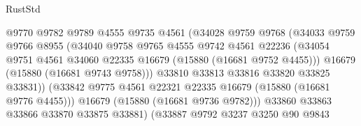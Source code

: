\begin{lexlean}{RustStd}
\begin{coremodule}
                                    @9770
                                    @9782
                                    @9789
                                    @4555
                                    @9735
                                    @4561
                                    (@34028
                                      @9759
                                      @9768
                                      (@34033
                                        @9759
                                        @9766
                                        @8955
                                        (@34040
                                          @9758
                                          @9765
                                          @4555
                                          @9742
                                          @4561
                                          @22236
                                          (@34054
                                            @9751
                                            @4561
                                            @34060
                                            @22335
                                            @16679
                                            (@15880 (@16681 @9752 @4455)))
                                          @16679
                                          (@15880 (@16681 @9743 @9758)))
                                        @33810
                                        @33813
                                        @33816
                                        @33820
                                        @33825
                                        @33831))
                                    (@33842
                                      @9775
                                      @4561
                                      @22321
                                      @22335
                                      @16679
                                      (@15880 (@16681 @9776 @4455)))
                                    @16679
                                    (@15880 (@16681 @9736 @9782)))
                                  @33860
                                  @33863
                                  @33866
                                  @33870
                                  @33875
                                  @33881)
                                (@33887
                                  @9792
                                  @3237
                                  @3250
                                  @90
                                  @9843

\end{coremodule}
\end{lexlean}
